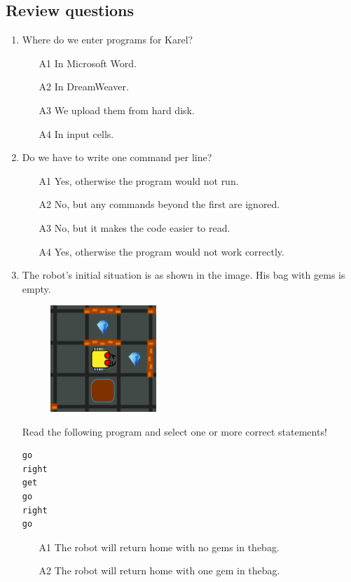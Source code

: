 \documentclass[article,A4,12pt]{llncs}
\begin{document}
\subsection{Review questions}

\begin{enumerate}
\item Where do we enter programs for Karel?
\begin{enumerate}
\item[A1] In Microsoft Word.
\item[A2] In DreamWeaver.
\item[A3] We upload them from hard disk.
\item[A4] In input cells.
\end{enumerate}
\item Do we have to write one command per line?
\begin{enumerate}
\item[A1] Yes, otherwise the program would not run.
\item[A2] No, but any commands beyond the first are ignored.
\item[A3] No, but it makes the code easier to read.
\item[A4] Yes, otherwise the program would not work correctly.
\end{enumerate}
\item The robot's initial situation is as shown in the image. His bag with gems is empty.
\begin{figure}[!ht]
\begin{center}
\includegraphics[width=4cm]{img/maze-0.png}
\end{center}
\end{figure}
\newpage
\noindent
Read the following program and select one or more correct statements!
\begin{verbatim}
go
right
get
go
right 
go
\end{verbatim}
\begin{enumerate}
\item[A1] The robot will return home with no gems in thebag.
\item[A2] The robot will return home with one gem in thebag.

\end{enumerate}
\end{enumerate}
\end{document}

